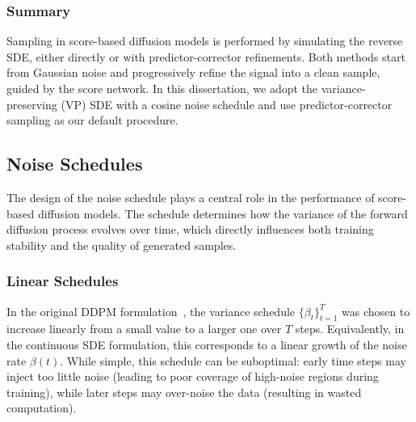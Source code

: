 \documentclass[a4paper,12pt]{article}
\begin{document}
\subsubsection{Summary}

Sampling in score-based diffusion models is performed by simulating the reverse SDE, either directly or with predictor-corrector refinements. Both methods start from Gaussian noise and progressively refine the signal into a clean sample, guided by the score network. In this dissertation, we adopt the variance-preserving (VP) SDE with a cosine noise schedule and use predictor-corrector sampling as our default procedure.

\subsection{Noise Schedules}
The design of the noise schedule plays a central role in the performance of score-based diffusion models. 
The schedule determines how the variance of the forward diffusion process evolves over time, which directly influences both training stability and the quality of generated samples.

\subsubsection*{Linear Schedules}

In the original DDPM formulation~\cite{hoDenoisingDiffusionProbabilistic2020}, the variance schedule \(\{\beta_t\}_{t=1}^T\) was chosen to increase linearly from a small value to a larger one over \(T\) steps. 
Equivalently, in the continuous SDE formulation, this corresponds to a linear growth of the noise rate \(\beta(t)\). While simple, this schedule can be suboptimal: early time steps may inject too little noise (leading to poor coverage of high-noise regions during training), while later steps may over-noise the data (resulting in wasted computation). 
\end{document}
